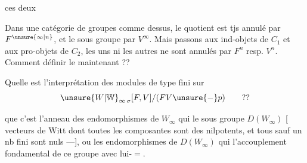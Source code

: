 
 ces deux 

Dans une catégorie de groupes comme dessus, le quotient est tjs annulé par $F^{\unsure{\infty|n}}$, et le sous groupe par $V^\infty$. Mais passons aux ind-objets de $C_1$ et aux pro-objets de $C_2$, les uns ni les autres ne sont annulés par $F^n$ resp. $V^n$. Comment définir le  maintenant ??

Quelle est l'interprétation des modules de type fini sur
\[\unsure{W|\mathbb W}_{\infty\,\sigma}[F,V]/(FV\unsure{-}p)\qquad ??\]

 que c'est l'anneau des endomorphismes de $W_\infty$ qui  le sous groupe $D(W_\infty)$ [ vecteurs de Witt dont toutes les composantes sont des nilpotents, et tous sauf un nb fini sont nuls ---], ou les endomorphismes de $D(W_\infty)$ qui  l'accouplement fondamental de ce groupe avec lui-$=$.
